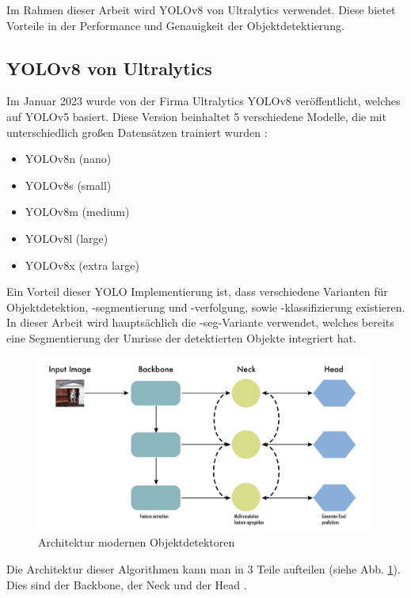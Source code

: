 {{	Im Rahmen dieser Arbeit wird YOLOv8 von Ultralytics verwendet. Diese bietet Vorteile in der Performance und Genauigkeit der Objektdetektierung.
	} 

	\subsection{YOLOv8 von Ultralytics}{ \label{subsec:YOLOv8_theoretic}
	
	Im Januar 2023 wurde von der Firma Ultralytics YOLOv8 veröffentlicht, welches auf YOLOv5 basiert. Diese Version beinhaltet 5 verschiedene Modelle, die mit unterschiedlich großen Datensätzen trainiert wurden  \citep{Terven2023}: 
	\begin{itemize}
		\item YOLOv8n (nano)
		\item YOLOv8s (small)
		\item YOLOv8m (medium)
		\item YOLOv8l (large)
		\item YOLOv8x (extra large)
	\end{itemize}
	Ein Vorteil dieser YOLO Implementierung ist, dass verschiedene Varianten für Objektdetektion, -segmentierung und -verfolgung, sowie -klassifizierung existieren. In dieser Arbeit wird hauptsächlich die \grqq -seg\glqq{}-Variante verwendet, welches bereits eine Segmentierung der Umrisse der detektierten Objekte integriert hat.
	\begin{figure}[h]
		\centering
		\includegraphics*[scale = 0.25, keepaspectratio]{images/YOLO/YOLOv8_object_detector_general.png}
		\caption[Architektur modernen Objektdetektoren]{Architektur modernen Objektdetektoren \citep{Terven2023}}
		\label{YOLO_obj_det_gen}
	\end{figure}
	Die Architektur dieser Algorithmen kann man in 3 Teile aufteilen (siehe Abb. \ref{YOLO_obj_det_gen}). Dies sind der Backbone, der Neck und der Head \citep{Terven2023}. \\
}}
